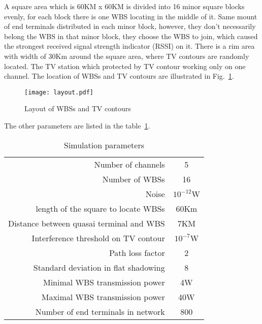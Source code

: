 A square area which is 60KM x 60KM is divided into 16 minor square blocks evenly, for each block there is one WBS locating in the middle of it. Same mount of end terminals distributed in each minor block, however, they don't necessarily belong the WBS in that minor block, they choose the WBS to join, which caused the strongest received signal strength indicator (RSSI) on it. There is a rim area with width of 30Km around the square area, where TV contours are randomly located. The TV station which protected by TV contour working only on one channel. 
The location of WBSs and TV contours are illustrated in Fig.~\ref{sim:layout}.
\begin{figure}[h!]
  \centering
  \texttt{[image: layout.pdf]}
  \caption{Layout of WBSs and TV contours}
  \label{sim:layout}
\end{figure}
The other parameters are listed in the table~\ref{simulationparameter}. 

\begin{table}[!h]
\caption{}\label{simulationparameter}
\centering

\begin{tabular}{|r|c|}
  \hline
  Number of channels 						& 5 \\
  Number of WBSs							& 16\\
  Noise 									& $10^{-12}$W \\ %
  length of the square to locate WBSs		& 60Km\\
  Distance between quasai terminal and WBS 	& 7KM \\
  Interference threshold on TV contour 		& $10^{-7}$W \\ %
  Path loss factor 							& 2 \\
  Standard deviation in flat shadowing		& 8\\
  Minimal WBS transmission power 			& 4W \\
  Maximal WBS transmission power 			& 40W \\
  Number of end terminals in network 		& 800 \\
  
  \hline
\end{tabular}
\caption{Simulation parameters}
\end{table}

